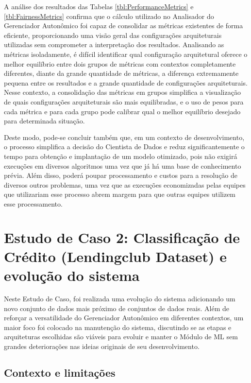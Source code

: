 \documentclass[Portugues,Final]{ic-tese-v3}
\begin{document}
A análise dos resultados das Tabelas \ref{tbl:PerformanceMetrics} e \ref{tbl:FairnessMetrics} confirma que o cálculo utilizado no Analisador do Gerenciador Autonômico foi capaz de consolidar as métricas existentes de forma eficiente, proporcionando uma visão geral das configurações arquiteturais utilizadas sem comprometer a interpretação dos resultados. Analisando as métricas isoladamente, é difícil identificar qual configuração arquitetural oferece o melhor equilíbrio entre dois grupos de métricas com contextos completamente diferentes, diante da grande quantidade de métricas, a diferença extremamente pequena entre os resultados e a grande quantidade de configurações arquiteturais. Nesse contexto, a consolidação das métricas em grupos simplifica a visualização de quais configurações arquiteturais são mais equilibradas, e o uso de pesos para cada métrica e para cada grupo pode calibrar qual o melhor equilíbrio desejado para determinada situação.

Deste modo, pode-se concluir também que, em um contexto de desenvolvimento, o processo simplifica a decisão do Cientista de Dados e reduz significantemente o tempo para obtenção e implantação de um modelo otimizado, pois não exigirá execuções em diversos algoritmos uma vez que já há uma base de conhecimento prévia. Além disso, poderá poupar processamento e custos para a resolução de diversos outros problemas, uma vez que as execuções economizadas pelas equipes que utilizariam esse processo abrem margem para que outras equipes utilizem esse processamento.

\chapter{Estudo de Caso 2: Classificação de Crédito (Lendingclub Dataset) e evolução do sistema}

Neste Estudo de Caso, foi realizada uma evolução do sistema adicionando um novo conjunto de dados mais próximo de conjuntos de dados reais. Além de reforçar a versatilidade do Gerenciador Autonômico em diferentes contextos, um maior foco foi colocado na manutenção do sistema, discutindo se as etapas e arquiteturas escolhidas são viáveis para evoluir e manter o Módulo de ML sem grandes deteriorações nas ideias originais de seu desenvolvimento.

\section{Contexto e limitações}
\end{document}
